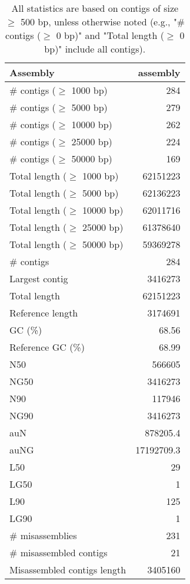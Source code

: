 \documentclass[12pt,a4paper]{article}
\begin{document}
\begin{table}[ht]
\begin{center}
\caption{All statistics are based on contigs of size $\geq$ 500 bp, unless otherwise noted (e.g., "\# contigs ($\geq$ 0 bp)" and "Total length ($\geq$ 0 bp)" include all contigs).}
\begin{tabular}{|l*{1}{|r}|}
\hline
Assembly & assembly \\ \hline
\# contigs ($\geq$ 1000 bp) & 284 \\ \hline
\# contigs ($\geq$ 5000 bp) & 279 \\ \hline
\# contigs ($\geq$ 10000 bp) & 262 \\ \hline
\# contigs ($\geq$ 25000 bp) & 224 \\ \hline
\# contigs ($\geq$ 50000 bp) & 169 \\ \hline
Total length ($\geq$ 1000 bp) & 62151223 \\ \hline
Total length ($\geq$ 5000 bp) & 62136223 \\ \hline
Total length ($\geq$ 10000 bp) & 62011716 \\ \hline
Total length ($\geq$ 25000 bp) & 61378640 \\ \hline
Total length ($\geq$ 50000 bp) & 59369278 \\ \hline
\# contigs & 284 \\ \hline
Largest contig & 3416273 \\ \hline
Total length & 62151223 \\ \hline
Reference length & 3174691 \\ \hline
GC (\%) & 68.56 \\ \hline
Reference GC (\%) & 68.99 \\ \hline
N50 & 566605 \\ \hline
NG50 & 3416273 \\ \hline
N90 & 117946 \\ \hline
NG90 & 3416273 \\ \hline
auN & 878205.4 \\ \hline
auNG & 17192709.3 \\ \hline
L50 & 29 \\ \hline
LG50 & 1 \\ \hline
L90 & 125 \\ \hline
LG90 & 1 \\ \hline
\# misassemblies & 231 \\ \hline
\# misassembled contigs & 21 \\ \hline
Misassembled contigs length & 3405160 \\ \hline

\end{tabular}
\end{center}
\end{table}
\end{document}
